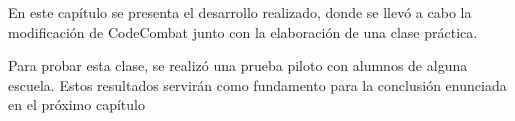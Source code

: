 En este capítulo se presenta el desarrollo realizado, donde se llevó a cabo la modificación de CodeCombat junto con la elaboración de una clase práctica.

Para probar esta clase, se realizó una prueba piloto con alumnos de alguna escuela. Estos resultados servirán como fundamento para la conclusión enunciada en el próximo capítulo